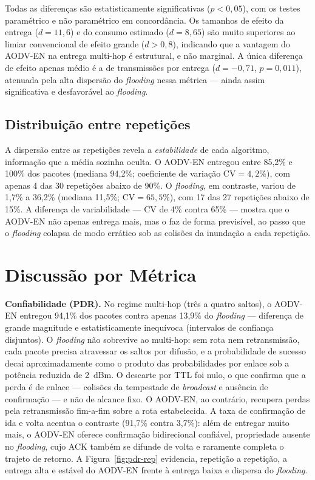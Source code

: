 Todas as diferenças são estatisticamente significativas ($p < 0{,}05$),
com os testes paramétrico e não paramétrico em concordância. Os tamanhos
de efeito da entrega ($d = 11{,}6$) e do consumo estimado ($d = 8{,}65$)
são muito superiores ao limiar convencional de efeito grande ($d > 0{,}8$),
indicando que a vantagem do AODV-EN na entrega multi-hop é estrutural, e
não marginal. A única diferença de efeito apenas médio é a de transmissões
por entrega ($d = -0{,}71$, $p = 0{,}011$), atenuada pela alta dispersão do
\emph{flooding} nessa métrica --- ainda assim significativa e desfavorável
ao \emph{flooding}.

\subsection{Distribuição entre repetições}\label{distribuiuxe7uxe3o-entre-repetiuxe7uxf5es}

A dispersão entre as repetições revela a \emph{estabilidade} de cada
algoritmo, informação que a média sozinha oculta. O AODV-EN entregou entre
85,2\% e 100\% dos pacotes (mediana 94,2\%; coeficiente de variação
$\mathrm{CV} = 4{,}2\%$), com apenas 4 das 30 repetições abaixo de 90\%. O
\emph{flooding}, em contraste, variou de 1,7\% a 36,2\% (mediana 11,5\%;
$\mathrm{CV} = 65{,}5\%$), com 17 das 27 repetições abaixo de 15\%. A
diferença de variabilidade --- CV de 4\%
contra 65\% --- mostra que o AODV-EN não apenas entrega mais, mas o faz de
forma previsível, ao passo que o \emph{flooding} colapsa de modo errático sob
as colisões da inundação a cada repetição.

\section{Discussão por Métrica}\label{discussuxe3o-por-muxe9trica}

\textbf{Confiabilidade (PDR).} No regime multi-hop (três a quatro
saltos), o AODV-EN entregou 94,1\% dos pacotes contra apenas 13,9\% do
\emph{flooding} --- diferença de grande magnitude e estatisticamente
inequívoca (intervalos de confiança disjuntos). O \emph{flooding} não
sobrevive ao multi-hop: sem rota nem retransmissão, cada pacote precisa
atravessar os saltos por difusão, e a probabilidade de sucesso decai
aproximadamente como o produto das probabilidades por enlace sob a
potência reduzida de 2~dBm. O descarte por TTL foi nulo, o que confirma
que a perda é de enlace --- colisões da tempestade de \emph{broadcast} e
ausência de confirmação --- e não de alcance fixo. O AODV-EN, ao
contrário, recupera perdas pela retransmissão fim-a-fim sobre a rota
estabelecida. A taxa de confirmação de ida e volta acentua o contraste
(91,7\% contra 3,7\%): além de entregar muito mais, o AODV-EN oferece
confirmação bidirecional confiável, propriedade ausente no
\emph{flooding}, cujo ACK também se difunde de volta e raramente completa
o trajeto de retorno. A Figura~\ref{fig:pdr-rep} evidencia, repetição a
repetição, a entrega alta e estável do AODV-EN frente à entrega baixa e
dispersa do \emph{flooding}.


